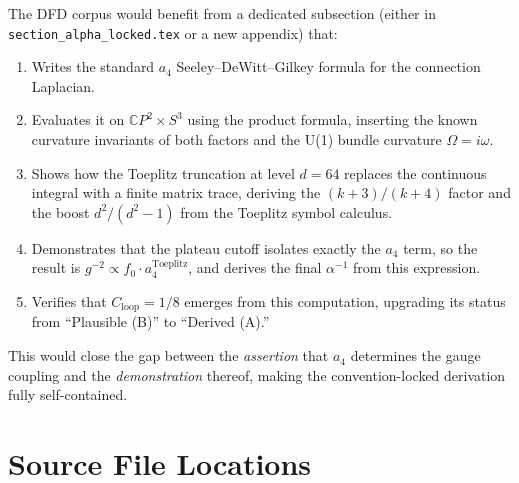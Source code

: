 \documentclass[11pt,a4paper]{article}
\begin{document}
The DFD corpus would benefit from a dedicated subsection (either in
\texttt{section\_alpha\_locked.tex} or a new appendix) that:

\begin{enumerate}
\item Writes the standard $a_4$ Seeley--DeWitt--Gilkey formula for the connection
Laplacian.

\item Evaluates it on $\mathbb{C}P^2 \times S^3$ using the product formula,
inserting the known curvature invariants of both factors and the U(1) bundle
curvature $\Omega = i\omega$.

\item Shows how the Toeplitz truncation at level $d = 64$ replaces the
continuous integral with a finite matrix trace, deriving the $(k+3)/(k+4)$
factor and the boost $d^2/(d^2-1)$ from the Toeplitz symbol calculus.

\item Demonstrates that the plateau cutoff isolates exactly the $a_4$ term,
so the result is $g^{-2} \propto f_0 \cdot a_4^{\mathrm{Toeplitz}}$, and
derives the final $\alpha^{-1}$ from this expression.

\item Verifies that $C_{\mathrm{loop}} = 1/8$ emerges from this computation,
upgrading its status from ``Plausible (B)'' to ``Derived (A).''
\end{enumerate}

This would close the gap between the \emph{assertion} that $a_4$ determines
the gauge coupling and the \emph{demonstration} thereof, making the
convention-locked derivation fully self-contained.

\section{Source File Locations}
\end{document}
